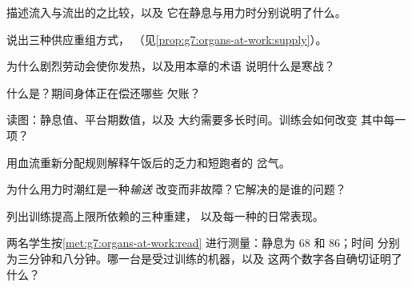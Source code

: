 \begin{exercise}[$\star$]\label{exo:g7:organs-at-work:3}
描述流入与流出的之比较，以及
它在静息与用力时分别说明了什么。
\end{exercise}

\begin{exercise}[$\star$]\label{exo:g7:organs-at-work:4}
说出三种供应重组方式，
（见\cref{prop:g7:organs-at-work:supply}）。
\end{exercise}

\begin{exercise}[$\star$]\label{exo:g7:organs-at-work:5}
为什么剧烈劳动会使你发热，以及用本章的术语
说明什么是寒战？
\end{exercise}

\begin{exercise}[$\star$]\label{exo:g7:organs-at-work:6}
什么是？期间身体正在偿还哪些
欠账？
\end{exercise}

\begin{exercise}[$\star\star$]\label{exo:g7:organs-at-work:7}
读图：静息值、平台期数值，以及
大约需要多长时间。训练会如何改变
其中每一项？
\end{exercise}

\begin{exercise}[$\star\star$]\label{exo:g7:organs-at-work:8}
用血流重新分配规则解释午饭后的乏力和短跑者的
岔气。
\end{exercise}

\begin{exercise}[$\star\star$]\label{exo:g7:organs-at-work:9}
为什么用力时潮红是一种\emph{输送}
改变而非故障？它解决的是谁的问题？
\end{exercise}

\begin{exercise}[$\star\star$]\label{exo:g7:organs-at-work:10}
列出训练提高上限所依赖的三种重建，
以及每一种的日常表现。
\end{exercise}

\begin{exercise}[$\star\star$]\label{exo:g7:organs-at-work:11}
两名学生按\cref{met:g7:organs-at-work:read}
进行测量：静息为 $68$ 和 $86$；时间
分别为三分钟和八分钟。哪一台是受过训练的机器，以及
这两个数字各自确切证明了什么？
\end{exercise}

